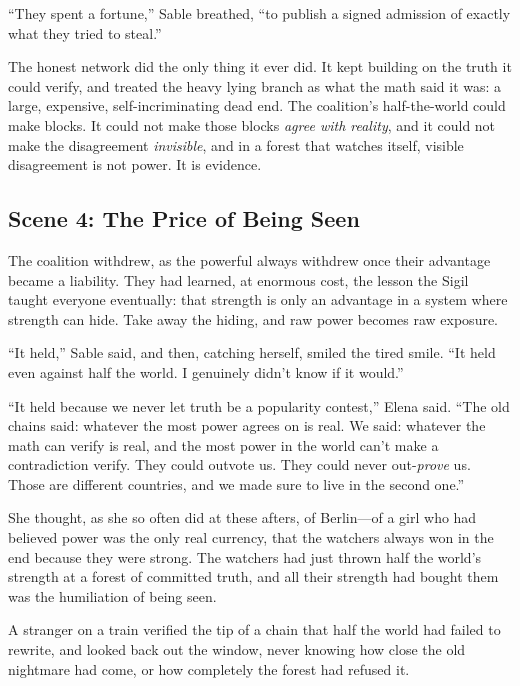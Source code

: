 ``They spent a fortune,'' Sable breathed, ``to publish a signed admission of
exactly what they tried to steal.''

The honest network did the only thing it ever did. It kept building on the truth it
could verify, and treated the heavy lying branch as what the math said it was: a
large, expensive, self-incriminating dead end. The coalition's half-the-world could
make blocks. It could not make those blocks \emph{agree with reality}, and it could
not make the disagreement \emph{invisible}, and in a forest that watches itself,
visible disagreement is not power. It is evidence.

\hypertarget{scene-4-the-price-of-being-seen}{%
\subsection{Scene 4: The Price of Being
Seen}\label{scene-4-the-price-of-being-seen}}

The coalition withdrew, as the powerful always withdrew once their advantage became
a liability. They had learned, at enormous cost, the lesson the Sigil taught
everyone eventually: that strength is only an advantage in a system where strength
can hide. Take away the hiding, and raw power becomes raw exposure.

``It held,'' Sable said, and then, catching herself, smiled the tired smile.
``It held even against half the world. I genuinely didn't know if it would.''

``It held because we never let truth be a popularity contest,'' Elena said. ``The
old chains said: whatever the most power agrees on is real. We said: whatever the
math can verify is real, and the most power in the world can't make a contradiction
verify. They could outvote us. They could never out-\emph{prove} us. Those are
different countries, and we made sure to live in the second one.''

She thought, as she so often did at these afters, of Berlin---of a girl who had
believed power was the only real currency, that the watchers always won in the end
because they were strong. The watchers had just thrown half the world's strength at
a forest of committed truth, and all their strength had bought them was the
humiliation of being seen.

A stranger on a train verified the tip of a chain that half the world had failed to
rewrite, and looked back out the window, never knowing how close the old nightmare
had come, or how completely the forest had refused it.

